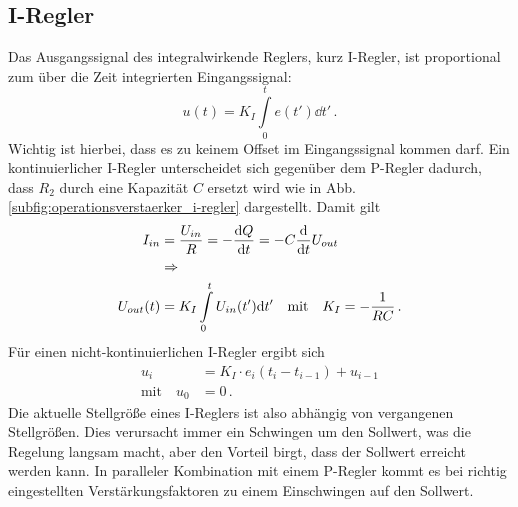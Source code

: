 \subsection{I-Regler}\label{i-regler}
Das Ausgangssignal des integralwirkende Reglers, kurz I-Regler, ist proportional
zum über die Zeit integrierten Eingangssignal:
\begin{equation}\label{eq:i-regler_01}
	u(t)=K_I\int\limits_0^te(t')\dd{t'}\,.
\end{equation}
Wichtig ist hierbei, dass es zu keinem Offset im Eingangssignal kommen darf. Ein
kontinuierlicher I-Regler unterscheidet sich gegenüber dem P-Regler dadurch, dass $R_2$ durch eine
Kapazität $C$ ersetzt wird wie in Abb.
\ref{subfig:operationsverstaerker_i-regler} dargestellt. Damit gilt
\begin{equation}\label{eq:i-regler_02}
	\begin{split}
		I_{in}&=\frac{U_{in}}{R}=-\frac{\mathrm{d} Q}{\mathrm{d} t}=-C\frac{\mathrm{d} }{\mathrm{d} t}U_{out}\\
		&\Rightarrow\\
		U_{out}(t)&=K_I\int\limits_0^tU_{in}(t')\mathrm{d}{t'}
		\quad\text{mit}\quad
		K_I=-\frac{1}{RC}\,.
	\end{split}
\end{equation}
Für einen nicht-kontinuierlichen I-Regler ergibt sich
\begin{equation}\label{eq:i-regler_03}
	\begin{split}
		u_i&=K_I\cdot e_i(t_i-t_{i-1})+u_{i-1}\\
		\text{mit}\quad
		u_{0}&=0\,.
	\end{split}
\end{equation}
Die aktuelle Stellgröße eines I-Reglers ist also abhängig von vergangenen
Stellgrößen. Dies verursacht immer ein Schwingen um den Sollwert, was die
Regelung langsam macht, aber den Vorteil birgt, dass der Sollwert erreicht
werden kann. In paralleler Kombination mit einem P-Regler kommt es bei richtig
eingestellten Verstärkungsfaktoren zu einem Einschwingen auf den Sollwert.

